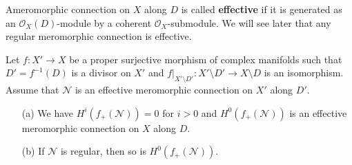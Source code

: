 Ameromorphic connection on $X$ along $D$ is called \textbf{effective} if it is generated as an $\mathscr{O}_X(D)$-module by a coherent $\mathscr{O}_X$-submodule. We will see later that any regular meromorphic connection is effective.

\begin{proposition}\label{D-module mero conn direct image under proper birational}
Let $f:X'\to X$ be a proper surjective morphism of complex manifolds such that $D'=f^{-1}(D)$ is a divisor on $X'$ and $f|_{X'\setminus D'}:X'\setminus D'\to X\setminus D$ is an isomorphism. Assume that $\mathscr{N}$ is an effective meromorphic connection on $X'$ along $D'$.
\begin{enumerate}
    \item[(a)] We have $H^i(f_+(\mathscr{N}))=0$ for $i>0$ and $H^0(f_+(\mathscr{N}))$ is an effective meromorphic connection on $X$ along $D$.
    \item[(b)] If $\mathscr{N}$ is regular, then so is $H^0(f_+(\mathscr{N}))$. 
\end{enumerate}
\end{proposition}
